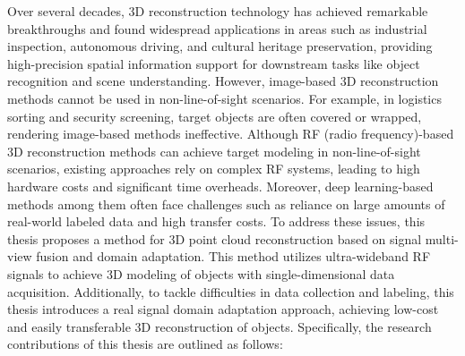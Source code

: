 
\begin{englishabstract}



    Over several decades, 3D reconstruction technology has achieved remarkable breakthroughs and found widespread applications in areas such as industrial inspection, autonomous driving, and cultural heritage preservation, providing high-precision spatial information support for downstream tasks like object recognition and scene understanding. However, image-based 3D reconstruction methods cannot be used in non-line-of-sight scenarios. For example, in logistics sorting and security screening, target objects are often covered or wrapped, rendering image-based methods ineffective. Although RF (radio frequency)-based 3D reconstruction methods can achieve target modeling in non-line-of-sight scenarios, existing approaches rely on complex RF systems, leading to high hardware costs and significant time overheads. Moreover, deep learning-based methods among them often face challenges such as reliance on large amounts of real-world labeled data and high transfer costs. To address these issues, this thesis proposes a method for 3D point cloud reconstruction based on signal multi-view fusion and domain adaptation. This method utilizes ultra-wideband RF signals to achieve 3D modeling of objects with single-dimensional data acquisition. Additionally, to tackle difficulties in data collection and labeling, this thesis introduces a real signal domain adaptation approach, achieving low-cost and easily transferable 3D reconstruction of objects. Specifically, the research contributions of this thesis are outlined as follows:


\end{englishabstract}
